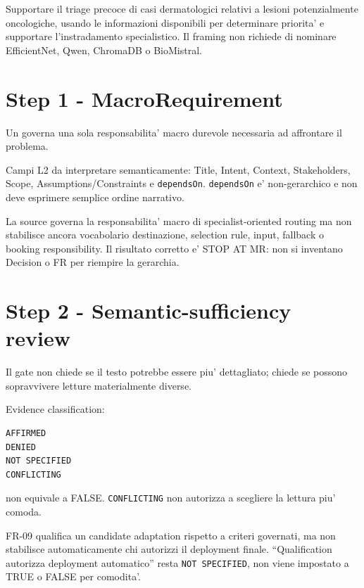 \documentclass[11pt,a4paper]{article}
\begin{document}
\begin{ddtaexample}[title={DermaTriage}]
Supportare il triage precoce di casi dermatologici relativi a lesioni potenzialmente oncologiche, usando le informazioni disponibili per determinare priorita' e supportare l'instradamento specialistico. Il framing non richiede di nominare EfficientNet, Qwen, ChromaDB o BioMistral.
\end{ddtaexample}

\section{Step 1 - MacroRequirement}
\closedtag

Un \MR{} governa una sola responsabilita' macro durevole necessaria ad affrontare il problema.

Campi L2 da interpretare semanticamente: Title, Intent, Context, Stakeholders, Scope, Assumptions/Constraints e \texttt{dependsOn}. \texttt{dependsOn} e' non-gerarchico e non deve esprimere semplice ordine narrativo.

\begin{ddtaexample}[title={DermaTriage MR-02 - STOP AT MR}]
La source governa la responsabilita' macro di specialist-oriented routing ma non stabilisce ancora vocabolario destinazione, selection rule, input, fallback o booking responsibility. Il risultato corretto e' STOP AT MR: non si inventano Decision o FR per riempire la gerarchia.
\end{ddtaexample}

\section{Step 2 - Semantic-sufficiency review}
\closedtag

Il gate non chiede se il testo potrebbe essere piu' dettagliato; chiede se possono sopravvivere letture materialmente diverse.

Evidence classification:
\begin{lstlisting}
AFFIRMED
DENIED
NOT SPECIFIED
CONFLICTING
\end{lstlisting}

\NS{} non equivale a FALSE. \texttt{CONFLICTING} non autorizza a scegliere la lettura piu' comoda.

\begin{ddtaexample}[title={DermaTriage deployment authority}]
FR-09 qualifica un candidate adaptation rispetto a criteri governati, ma non stabilisce automaticamente chi autorizzi il deployment finale. ``Qualification autorizza deployment automatico'' resta \texttt{NOT SPECIFIED}, non viene impostato a TRUE o FALSE per comodita'.
\end{ddtaexample}
\end{document}
